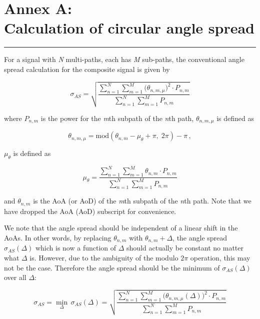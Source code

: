 \documentclass[a4paper,11pt]{article}
\begin{document}
\section*{Annex A:\\Calculation of circular angle spread}

\noindent\rule{\textwidth}{0.4pt}

\vspace{1em}

For a signal with \textit{N} multi-paths, each has \textit{M} sub-paths, the conventional angle spread calculation for the composite signal is given by

\begin{equation}
\sigma_{AS} = \sqrt{\frac{\displaystyle\sum_{n=1}^{N}\sum_{m=1}^{M}\bigl(\theta_{n,m,\mu}\bigr)^{2}\cdot P_{n,m}}{\displaystyle\sum_{n=1}^{N}\sum_{m=1}^{M}P_{n,m}}}
\label{eq:A1}
\end{equation}

where $P_{n,m}$ is the power for the \textit{m}th subpath of the \textit{n}th path, $\theta_{n,m,\mu}$ is defined as

\begin{equation}
\theta_{n,m,\mu} = \mathrm{mod}\!\left(\theta_{n,m} - \mu_{\theta} + \pi,\; 2\pi\right) - \pi\,,
\label{eq:A2}
\end{equation}

$\mu_{\theta}$ is defined as

\begin{equation}
\mu_{\theta} = \frac{\displaystyle\sum_{n=1}^{N}\sum_{m=1}^{M}\theta_{n,m}\cdot P_{n,m}}{\displaystyle\sum_{n=1}^{N}\sum_{m=1}^{M}P_{n,m}}
\label{eq:A3}
\end{equation}

and $\theta_{n,m}$ is the AoA (or AoD) of the \textit{m}th subpath of the \textit{n}th path. Note that we have dropped the AoA (AoD) subscript for convenience.

We note that the angle spread should be independent of a linear shift in the AoAs. In other words, by replacing $\theta_{n,m}$ with $\theta_{n,m}+\Delta$, the angle spread $\sigma_{AS}(\Delta)$ which is now a function of $\Delta$ should actually be constant no matter what $\Delta$ is. However, due to the ambiguity of the modulo $2\pi$ operation, this may not be the case. Therefore the angle spread should be the minimum of $\sigma_{AS}(\Delta)$ over all $\Delta$:

\begin{equation}
\sigma_{AS} = \min_{\Delta}\,\sigma_{AS}(\Delta) = \sqrt{\frac{\displaystyle\sum_{n=1}^{N}\sum_{m=1}^{M}\bigl(\theta_{n,m,\mu}(\Delta)\bigr)^{2}\cdot P_{n,m}}{\displaystyle\sum_{n=1}^{N}\sum_{m=1}^{M}P_{n,m}}}
\label{eq:A4}
\end{equation}
\end{document}
